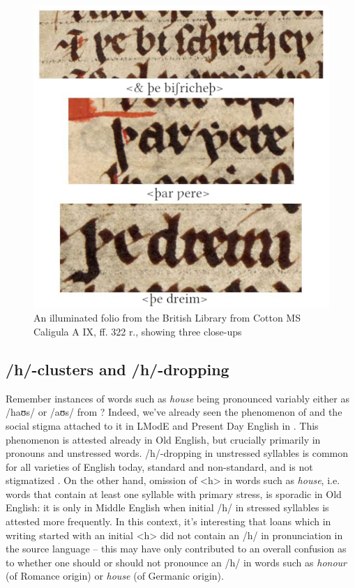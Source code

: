 \begin{figure}[t]
    \includegraphics[height=0.5\textheight]{chapters/img/Ch5_Thorn_mod.jpg}
    \caption{An illuminated folio from the British Library from Cotton MS Caligula A IX, ff. 322 r., showing three close-ups}
    \label{fig:thorn}
\end{figure}

\subsection{/h/-clusters and /h/-dropping}\label{ME-hdrop}
Remember instances of words such as \textit{house} being pronounced variably either as /haʊs/ or /aʊs/ from ? Indeed, we've already seen the phenomenon of  and the social stigma attached to it in LModE and Present Day English in . This phenomenon is attested already in Old English, but crucially primarily in pronouns and unstressed words. /h/-dropping in unstressed syllables is common for all varieties of English today, standard and non-standard, and is not stigmatized \citep[104]{Minkova2014}. On the other hand, omission of <h> in words such as \textit{house}, i.e. words that contain at least one syllable with primary stress, is sporadic in Old English: it is only in Middle English when initial /h/ in stressed syllables is attested more frequently. In this context, it's interesting that  loans which in writing started with an initial <h> did not contain an /h/ in pronunciation in the source language -- this may have only contributed to an overall confusion as to whether one should or should not pronounce an /h/ in words such as \textit{honour} (of Romance origin) or \textit{house} (of Germanic origin).

